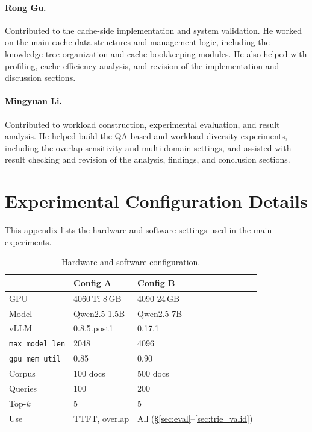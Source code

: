 \documentclass{article}
\begin{document}
\paragraph{Rong Gu.}
Contributed to the cache-side implementation and system validation. He worked on the main cache data structures and management logic, including the knowledge-tree organization and cache bookkeeping modules. He also helped with profiling, cache-efficiency analysis, and revision of the implementation and discussion sections.

\paragraph{Mingyuan Li.}
Contributed to workload construction, experimental evaluation, and result analysis. He helped build the QA-based and workload-diversity experiments, including the overlap-sensitivity and multi-domain settings, and assisted with result checking and revision of the analysis, findings, and conclusion sections.

\endgroup

\appendix

\section{Experimental Configuration Details}
\label{app:config}

This appendix lists the hardware and software settings used in the main experiments.

\begin{table}[H]
\caption{Hardware and software configuration.}
\centering
\footnotesize
\begin{tabular}{@{}lll@{}}
\toprule
 & \textbf{Config A} & \textbf{Config B} \\
\midrule
GPU & 4060\,Ti 8\,GB & 4090 24\,GB \\
Model & Qwen2.5-1.5B & Qwen2.5-7B \\
vLLM & 0.8.5.post1 & 0.17.1 \\
\texttt{max\_model\_len} & 2048 & 4096 \\
\texttt{gpu\_mem\_util} & 0.85 & 0.90 \\
Corpus & 100 docs & 500 docs \\
Queries & 100 & 200 \\
Top-$k$ & 5 & 5 \\
Use & TTFT, overlap & All (\S\ref{sec:eval}--\ref{sec:trie_valid}) \\
\bottomrule
\end{tabular}%

\end{table}
\end{document}
